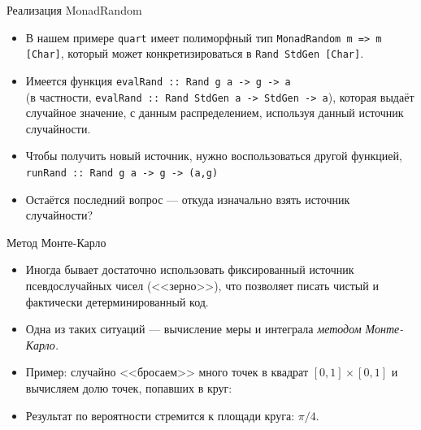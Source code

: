 \documentclass[xcolor=dvipsnames]{beamer}
\begin{document}
\begin{frame}{Реализация MonadRandom}
 
 \begin{itemize}[<+->]
  \item В нашем примере {\tt quart} имеет полиморфный тип \texttt{MonadRandom m => m [Char]}, который может конкретизироваться в \texttt{Rand StdGen [Char]}.
  \item Имеется функция \texttt{evalRand :: Rand g a -> g -> a} \\ (в частности, \texttt{evalRand :: Rand StdGen a -> StdGen -> a}), которая выдаёт случайное значение, с данным распределением, используя данный источник случайности.
  \item Чтобы получить новый источник, нужно воспользоваться другой функцией, 
  \texttt{runRand :: Rand g a -> g -> (a,g)}
  \item Остаётся последний вопрос --- откуда изначально взять источник случайности?
 \end{itemize}

\end{frame}

\begin{frame}{Метод Монте-Карло}

\begin{itemize}[<+->]
\item Иногда бывает достаточно использовать фиксированный источник псевдослучайных чисел (<<зерно>>), что позволяет писать чистый и фактически детерминированный код.
\item Одна из таких ситуаций --- вычисление меры и интеграла {\em методом Монте-Карло.}
\item Пример: случайно <<бросаем>> много точек в квадрат $[0,1] \times [0,1]$ и вычисляем долю точек, попавших в круг:
\begin{center}
\end{center}
\item Результат по вероятности стремится к площади круга: $\pi/4$.
\end{itemize}

 
\end{frame}
\end{document}

